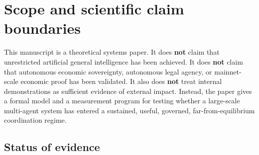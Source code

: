\documentclass[
  11pt,
]{article}
\begin{document}
\section{Scope and scientific claim
boundaries}\label{scope-and-scientific-claim-boundaries}

This manuscript is a theoretical systems paper. It does \textbf{not}
claim that unrestricted artificial general intelligence has been
achieved. It does \textbf{not} claim that autonomous economic
sovereignty, autonomous legal agency, or mainnet-scale economic proof
has been validated. It also does \textbf{not} treat internal
demonstrations as sufficient evidence of external impact. Instead, the
paper gives a formal model and a measurement program for testing whether
a large-scale multi-agent system has entered a sustained, useful,
governed, far-from-equilibrium coordination regime.

\subsection{Status of evidence}\label{status-of-evidence}
\end{document}
